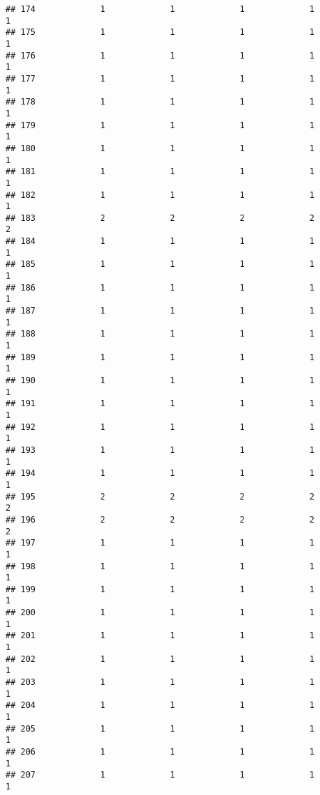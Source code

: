 \documentclass[
]{article}
\begin{document}
\begin{verbatim}
## 174             1             1             1             1             1
## 175             1             1             1             1             1
## 176             1             1             1             1             1
## 177             1             1             1             1             1
## 178             1             1             1             1             1
## 179             1             1             1             1             1
## 180             1             1             1             1             1
## 181             1             1             1             1             1
## 182             1             1             1             1             1
## 183             2             2             2             2             2
## 184             1             1             1             1             1
## 185             1             1             1             1             1
## 186             1             1             1             1             1
## 187             1             1             1             1             1
## 188             1             1             1             1             1
## 189             1             1             1             1             1
## 190             1             1             1             1             1
## 191             1             1             1             1             1
## 192             1             1             1             1             1
## 193             1             1             1             1             1
## 194             1             1             1             1             1
## 195             2             2             2             2             2
## 196             2             2             2             2             2
## 197             1             1             1             1             1
## 198             1             1             1             1             1
## 199             1             1             1             1             1
## 200             1             1             1             1             1
## 201             1             1             1             1             1
## 202             1             1             1             1             1
## 203             1             1             1             1             1
## 204             1             1             1             1             1
## 205             1             1             1             1             1
## 206             1             1             1             1             1
## 207             1             1             1             1             1

\end{verbatim}
\end{document}
